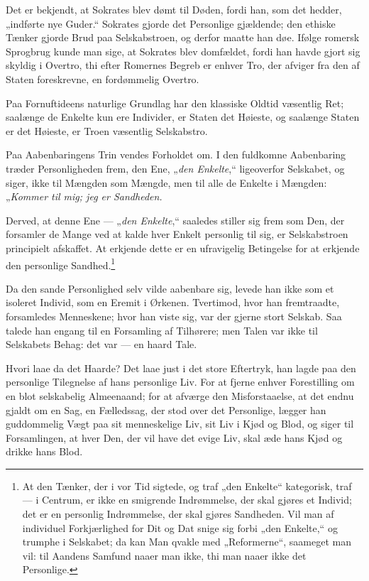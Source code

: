 \documentclass[12pt,a4paper]{book}
\newcommand{\apage}[1]{\marginnote{\footnotesize\textit{[#1]}}}
\begin{document}
Det er bekjendt, at Sokrates blev dømt til Døden, fordi han, som det hedder, „indførte nye Guder.“ Sokrates gjorde det Personlige gjældende; den ethiske Tænker gjorde Brud paa Selskabstroen, og derfor maatte han døe. Ifølge romersk Sprogbrug kunde man sige, at Sokrates blev domfældet, fordi han havde gjort sig skyldig i Overtro, thi efter Romernes Begreb er enhver Tro, der afviger fra den af Staten foreskrevne, en fordømmelig Overtro.

Paa Fornuftideens naturlige Grundlag har den klassiske Oldtid væsentlig Ret; saalænge de Enkelte kun ere Individer, er Staten det Høieste, og saalænge Staten er det Høieste, er Troen væsentlig Selskabstro.

Paa Aabenbaringens Trin vendes Forholdet om. I den fuldkomne Aabenbaring træder Personligheden frem, den Ene, „\emph{den Enkelte},“ ligeoverfor Selskabet, og siger, ikke til Mængden som Mængde, men til alle de Enkelte i Mængden: „\emph{Kommer til mig; jeg er Sandheden.}

Derved, at denne Ene --- „\emph{den Enkelte},“ saaledes stiller sig frem som Den, der forsamler de Mange ved at kalde hver Enkelt personlig til sig, er Selskabstroen principielt afskaffet. At erkjende dette er en ufravigelig Betingelse for at erkjende den personlige Sandhed.\footnote{At den Tænker, der i vor Tid sigtede, og traf „den Enkelte“ kategorisk, traf --- i Centrum, er ikke en smigrende Indrømmelse, der skal gjøres et Individ; det er en personlig Indrømmelse, der skal gjøres Sandheden. Vil man af individuel Forkjærlighed for Dit og Dat snige sig forbi „den Enkelte,“ og trumphe i Selskabet; da kan Man qvakle med „Reformerne“, saameget man vil: til Aandens Samfund naaer man ikke, thi man naaer ikke det Personlige.}

Da den sande Personlighed selv vilde aabenbare sig, levede han ikke som et isoleret Individ, som en Eremit i \apage{49}
Ørkenen. Tvertimod, hvor han fremtraadte, forsamledes Menneskene; hvor han viste sig, var der gjerne stort Selskab. Saa talede han engang til en Forsamling af Tilhørere; men Talen var ikke til Selskabets Behag: det var --- en haard Tale.

Hvori laae da det Haarde? Det laae just i det store Eftertryk, han lagde paa den personlige Tilegnelse af hans personlige Liv. For at fjerne enhver Forestilling om en blot selskabelig Almeenaand; for at afværge den Misforstaaelse, at det endnu gjaldt om en Sag, en Fælledssag, der stod over det Personlige, lægger han guddommelig Vægt paa sit menneskelige Liv, sit Liv i Kjød og Blod, og siger til Forsamlingen, at hver Den, der vil have det evige Liv, skal æde hans Kjød og drikke hans Blod.
\end{document}
